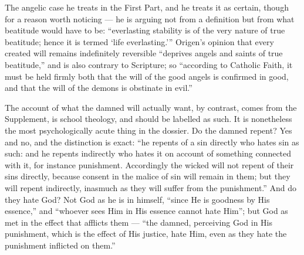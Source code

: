 The angelic case he treats in the First Part, and he treats it as certain, though for a reason worth noticing --- he is arguing not from a definition but from what beatitude would have to be: ``everlasting stability is of the very nature of true beatitude; hence it is termed `life everlasting.''' Origen's opinion that every created will remains indefinitely reversible ``deprives angels and saints of true beatitude,'' and is also contrary to Scripture; so ``according to Catholic Faith, it must be held firmly both that the will of the good angels is confirmed in good, and that the will of the demons is obstinate in evil.''

The account of what the damned will actually want, by contrast, comes from the Supplement, is school theology, and should be labelled as such. It is nonetheless the most psychologically acute thing in the dossier. Do the damned repent? Yes and no, and the distinction is exact: ``he repents of a sin directly who hates sin as such: and he repents indirectly who hates it on account of something connected with it, for instance punishment. Accordingly the wicked will not repent of their sins directly, because consent in the malice of sin will remain in them; but they will repent indirectly, inasmuch as they will suffer from the punishment.'' And do they hate God? Not God as he is in himself, ``since He is goodness by His essence,'' and ``whoever sees Him in His essence cannot hate Him''; but God as met in the effect that afflicts them --- ``the damned, perceiving God in His punishment, which is the effect of His justice, hate Him, even as they hate the punishment inflicted on them.''

